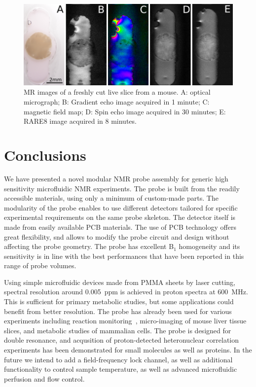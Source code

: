 \documentclass[preprint,5p]{elsarticle}
\begin{document}
\begin{figure}
\centering
\includegraphics[width=.7\linewidth,keepaspectratio=true]{./figures/ms5n17-tisli-im-180511.png} 
\caption{MR images of a freshly cut live slice from a mouse. A: optical micrograph; B: Gradient echo image acquired in 1 minute; C: magnetic field map; D: Spin echo image acquired in 30 minutes; E: RARE8 image acquired in 8 minutes.}
\label{fig:tisli} 
\end{figure}


\section{Conclusions}
We have presented a novel modular NMR probe assembly for generic high 
sensitivity microfluidic NMR experiments. 
The probe is built from the readily accessible materials, using only a minimum
of custom-made parts. 
The modularity of the probe enables to use different detectors 
tailored for specific experimental requirements on the same probe skeleton. 
The detector itself is made from easily available PCB materials. 
The use of PCB technology offers great flexibility, snd allows to modify the 
probe circuit and design without affecting the probe geometry. 
The probe has excellent B$_1$ homogeneity and its sensitivity is in line with
the best performances that have been reported in this range of probe volumes.

Using simple microfluidic devices made from PMMA sheets by laser cutting,
spectral resolution around 0.005~ppm is achieved in proton spectra at 
600~MHz. This is sufficient for primary metabolic studies, but some
applications could benefit from better resolution. The probe has already been 
used for various  experiments including reaction monitoring~\cite{Fang-2018}, 
micro-imaging of mouse liver tissue slices, and metabolic studies of 
mammalian cells. The probe is designed for double resonance, and
acqusition of proton-detected heteronuclear correlation experiments
has been demonstrated for small molecules as well as proteins. 
In the future we intend to add a field-frequency lock channel,
as well as additional functionality to control sample temperature, 
as well as advanced microfluidic perfusion and flow control.
\end{document}
